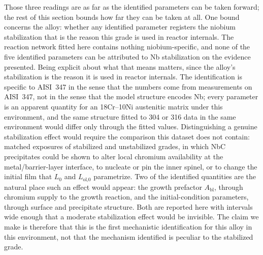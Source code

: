 \documentclass[a4paper,fleqn]{cas-sc}
\begin{document}
Those three readings are as far as the identified parameters can be
taken forward; the rest of this section bounds how far they can be taken
at all. One bound concerns the alloy: whether any identified
parameter registers the niobium stabilization that is the reason this
grade is used in reactor internals. The reaction network fitted here
contains nothing niobium-specific, and none of the five identified
parameters can be attributed to Nb stabilization on the evidence
presented. Being explicit about what that means matters, since the
alloy's stabilization is the reason it is used in reactor internals. The
identification is specific to AISI~347 in the sense that the numbers
come from measurements on AISI~347, not in the sense that the model
structure encodes Nb; every parameter is an apparent quantity for an
18Cr--10Ni austenitic matrix under this environment, and the same
structure fitted to 304 or 316 data in the same environment would differ
only through the fitted values. Distinguishing a genuine stabilization
effect would require the comparison this dataset does not contain:
matched exposures of stabilized and unstabilized grades, in which NbC
precipitates could be shown to alter local chromium availability at the
metal/barrier-layer interface, to nucleate or pin the inner spinel, or
to change the initial film that $L_0$ and $L_\text{ol,0}$ parametrize.
Two of the identified quantities are the natural place such an effect
would appear: the growth prefactor $A_\text{bl}$, through chromium
supply to the growth reaction, and the initial-condition parameters,
through surface and precipitate structure. Both are reported here with
intervals wide enough that a moderate stabilization effect would be
invisible. The claim we make is therefore that this is the first
mechanistic identification for this alloy in this environment, not that
the mechanism identified is peculiar to the stabilized grade.
\end{document}
